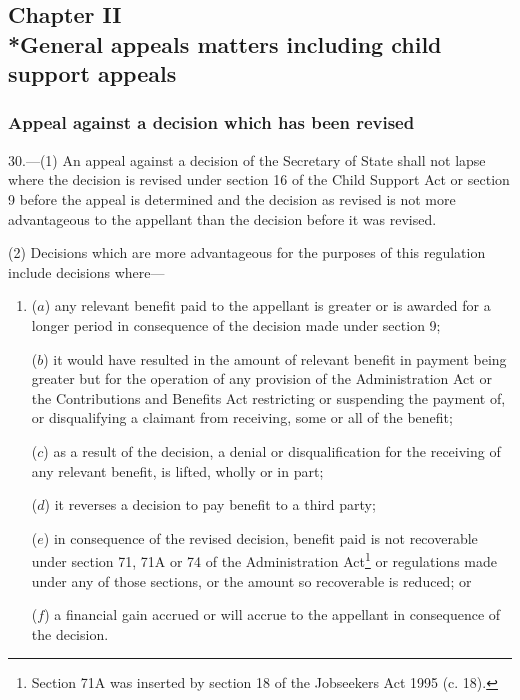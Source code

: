 \documentclass[12pt,a4paper]{article}
\begin{document}
\subsection[Chapter II --- General appeals matters including child support appeals]{Chapter II\\*General appeals matters including child support appeals}

\renewcommand\parthead{--- Part IV Chapter II}

\subsubsection[30. Appeal against a decision which has been revised]{Appeal against a decision which has been revised}

30.—(1) An appeal against a decision of the Secretary of State shall not lapse where the decision is revised under section 16 of the Child Support Act or section 9 before the appeal is determined and the decision as revised is not more advantageous to the appellant than the decision before it was revised.

(2) Decisions which are more advantageous for the purposes of this regulation include decisions where—
\begin{enumerate}\item[]
($a$) any relevant benefit paid to the appellant is greater or is awarded for a longer period in consequence of the decision made under section 9;

($b$) it would have resulted in the amount of relevant benefit in payment being greater but for the operation of any provision of the Administration Act or the Contributions and Benefits Act restricting or suspending the payment of, or disqualifying a claimant from receiving, some or all of the benefit;

($c$) as a result of the decision, a denial or disqualification for the receiving of any relevant benefit, is lifted, wholly or in part;

($d$) it reverses a decision to pay benefit to a third party;

($e$) in consequence of the revised decision, benefit paid is not recoverable under section 71, 71A or 74 of the Administration Act\footnote{\frenchspacing Section 71A was inserted by section 18 of the Jobseekers Act 1995 (c. 18).} or regulations made under any of those sections, or the amount so recoverable is reduced; or

($f$) a financial gain accrued or will accrue to the appellant in consequence of the decision.
\end{enumerate}
\end{document}
